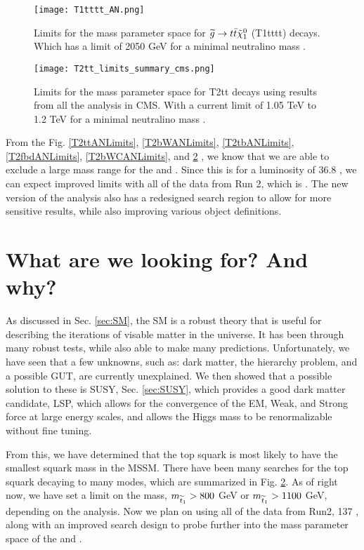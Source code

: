 \begin{figure}
\centering
	\texttt{[image: T1tttt\_AN.png]}
 	\caption[T2bWC Limits]{Limits for the mass parameter space for $\widetilde{g}\rightarrow t\bar{t}\tilde{\chi}^{0}_{1}$ (T1tttt) decays. Which has a limit of 2050 GeV for a minimal neutralino mass \cite{cms_collaboration_search_2018}.}
 	\label{T1ttttANLimits} 
\end{figure}

\begin{figure}
\centering
	\texttt{[image: T2tt\_limits\_summary\_cms.png]}
 	\caption[T2tt Limits for all decay modes]{Limits for the mass parameter space for T2tt decays using results from all the analysis in CMS. With a current limit of 1.05 TeV to 1.2 TeV for a minimal neutralino mass \cite{noauthor_https://twiki.cern.ch/twiki/bin/view/cmspublic/physicsresultssus_nodate}.}
 	\label{T2ttCMSAll} 
\end{figure}

From the Fig. \ref{T2ttANLimits}, \ref{T2bWANLimits}, \ref{T2tbANLimits}, \ref{T2fbdANLimits}, \ref{T2bWCANLimits}, and \ref{T2ttCMSAll} \cite{sirunyan_search_2017, noauthor_https://twiki.cern.ch/twiki/bin/view/cmspublic/physicsresultssus_nodate}, we know that we are able to exclude a large mass range for the \st{} and \neutralino{}. Since this is for a luminosity of 36.8 \fb, we can expect improved limits with all of the data from Run 2, which is \datalumi. The new version of the analysis also has a redesigned search region to allow for more sensitive results, while also improving various object definitions.

\section{What are we looking for? And why?}
As discussed in Sec. \ref{sec:SM}, the SM is a robust theory that is useful for describing the iterations of visable matter in the universe. It has been through many robust tests, while also able to make many predictions. Unfortunately, we have seen that a few unknowns, such as: dark matter, the hierarchy problem, and a possible GUT, are currently unexplained. We then showed that a possible solution to these is SUSY, Sec. \ref{sec:SUSY}, which provides a good dark matter candidate, LSP, which allows for the convergence of the EM, Weak, and Strong force at large energy scales, and allows the Higgs mass to be renormalizable without fine tuning. 

From this, we have determined that the top squark is most likely to have the smallest squark mass in the MSSM. There have been many searches for the top squark decaying to many modes, which are summarized in Fig. \ref{T2ttCMSAll}. As of right now, we have set a limit on the \st{} mass, $m_{\widetilde{t}_1}>800$ GeV or $m_{\widetilde{t}_1}>1100$ GeV, depending on the analysis. Now we plan on using all of the data from Run2, 137 \fb, along with an improved search design to probe further into the mass parameter space of the \st{} and \neutralino{}.
